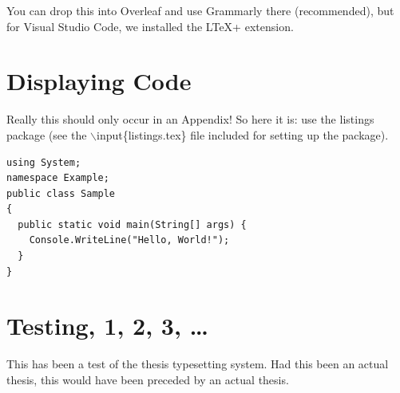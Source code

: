 \documentclass[ms,twoside,print]{nuthesis}
\theoremstyle{definition}
\begin{document}
You can drop this into Overleaf and use Grammarly there (recommended), but for Visual Studio Code, we installed the LTeX+ extension.

\chapter{Displaying Code}

Really this should only occur in an Appendix! So here it is: use the listings package (see the $\backslash$input\{listings.tex\} file included for setting up the package).

\begin{lstlisting}[label={lst:code},caption={A simple example of code.}]
using System;
namespace Example;
public class Sample 
{
  public static void main(String[] args) {
    Console.WriteLine("Hello, World!");
  }
}
\end{lstlisting}


\chapter{Testing, 1, 2, 3, \ldots}

This has been a test of the thesis typesetting system.
Had this been an actual thesis, this would have been
preceded by an actual thesis.




\end{document}
